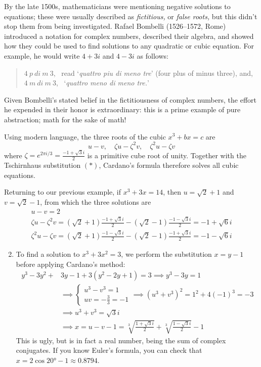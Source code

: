 
By the late 1500s, mathematicians were mentioning negative solutions to equations; these were usually described as \emph{fictitious,} or \emph{false roots,} but this didn't stop them from being investigated. Rafael Bombelli (1526--1572, Rome) introduced a notation for complex numbers, described their algebra, and showed how they could be used to find solutions to any quadratic or cubic equation. For example, he would write $4+3i$ and $4-3i$ as follows:
\begin{quote}
$4\ p\ di\ m\ 3$, \ read `\emph{quattro piu di meno tre}' (four plus of minus three), and,\\
$4\ m\ di\ m\ 3$, \ `\emph{quattro meno di meno tre.}'
\end{quote}
Given Bombelli's stated belief in the fictitiousness of complex numbers, the effort he expended in their honor is extraordinary: this is a prime example of pure abstraction; math for the sake of math!\medbreak

Using modern language, the three roots of the cubic $x^3+bx=c$ are
\[u-v,\quad \zeta u-\zeta^2v,\quad \zeta^2u-\zeta v\]
where $\zeta=e^{2\pi i/3} =\frac{-1+\sqrt 3i}2$ is a primitive cube root of unity. Together with the Tschirnhaus substitution $(\ast)$, Cardano's formula therefore solves all cubic equations.\smallbreak


\exstart Returning to our previous example, if $x^3+3x=14$, then $u=\sqrt 2+1$ and $v=\sqrt 2-1$, from which the three solutions are
\begin{gather*}
u-v=2\\
\zeta u-\zeta^2v=(\sqrt 2+1)\frac{-1+\sqrt 3i}2-(\sqrt 2-1)\frac{-1-\sqrt 3i}2 =-1+\sqrt 6i\\
\zeta^2u-\zeta v=(\sqrt 2+1)\frac{-1-\sqrt 3i}2-(\sqrt 2-1)\frac{-1+\sqrt 3i}2 =-1-\sqrt 6i
\end{gather*}

\begin{enumerate}\setcounter{enumi}{1}
  \item To find a solution to $x^3+3x^2=3$, we perform the substitution $x=y-1$ before applying Cardano's method:
\begin{align*}
y^3-3y^2+&3y-1+3(y^2-2y+1)=3\implies y^3-3y=1 \tag{$b=-3$, $c=1$}\\
&\implies \begin{cases}
u^3-v^3=1\\
uv=-\frac 33=-1
\end{cases} \implies (u^3+v^3)^2=1^2+4(-1)^3=-3\\
&\implies u^3+v^3=\sqrt 3i\\
&\implies x=u-v-1=\sqrt[3]{\frac{1+\sqrt 3i}2}+\sqrt[3]{\frac{1-\sqrt 3i}2}-1 %
\end{align*}
This is ugly, but is in fact a real number, being the sum of complex conjugates. If you know Euler's formula, you can check that $x=2\cos\ang{20}-1\approx 0.8794$.
\end{enumerate}

